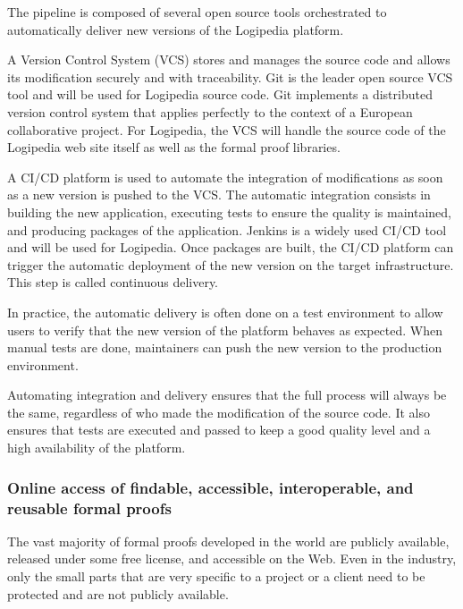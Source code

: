 The pipeline is composed of several open source tools orchestrated
to automatically deliver new versions of the Logipedia platform.

\begin{compactitem}
\item
A Version Control System (VCS) stores and manages the source code and
allows its modification securely and with traceability. Git is the leader
open source VCS tool and will be used for Logipedia source code. Git implements
a distributed version control system that applies perfectly to the context of
a European collaborative project. For Logipedia, the VCS will handle the
source code of the Logipedia web site itself as well as the formal proof libraries.
\item
A CI/CD platform is used to automate the integration of modifications
as soon as a new version is pushed to the VCS. The automatic integration
consists in building the new application, executing tests to ensure
the quality is maintained, and producing packages of the application.
Jenkins is a widely used CI/CD tool and will be used for Logipedia.
Once packages are built, the CI/CD platform can trigger the automatic
deployment of the new version on the target infrastructure.
This step is called continuous delivery.
\end{compactitem}

In practice, the automatic delivery is often done on a test environment
to allow users to verify that the new version of the platform
behaves as expected. When manual tests are done, maintainers can push
the new version to the production environment.

Automating integration and delivery ensures that the full process
will always be the same, regardless of who made the modification
of the source code. It also ensures that tests are executed and passed
to keep a good quality level and a high availability of the platform.

\subsubsection*{Online access of findable, accessible, interoperable, and
reusable formal proofs}

The vast majority of formal proofs developed in the world are publicly
available, released under some free license, and accessible on the
Web. Even in the industry, only the small parts that are very specific
to a project or a client need to be protected and are not publicly
available.

